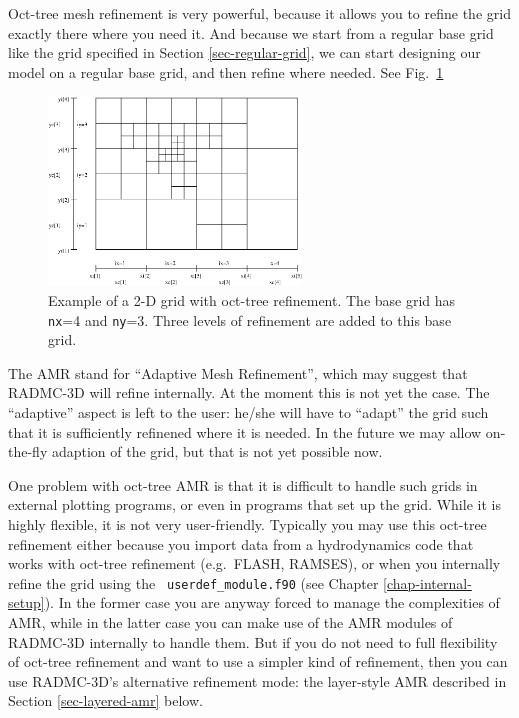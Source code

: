\documentclass{report}
\begin{document}
Oct-tree mesh refinement is very powerful, because it allows you to refine
the grid exactly there where you need it. And because we start from a
regular base grid like the grid specified in Section \ref{sec-regular-grid},
we can start designing our model on a regular base grid, and then refine
where needed. See Fig.~\ref{fig-oct-tree-amr}
%
\begin{figure}
\centerline{\includegraphics[width=0.6\textwidth]{oct_tree_amr_bare.eps}}
\caption{\label{fig-oct-tree-amr}
Example of a 2-D grid with oct-tree refinement. The base grid has
{\small\tt nx}=4 and {\small\tt ny}=3. Three levels of refinement are
added to this base grid. 
}
\end{figure}
%

The AMR stand for ``Adaptive Mesh Refinement'', which may suggest that 
RADMC-3D will refine internally. At the moment this is not yet the case.
The ``adaptive'' aspect is left to the user: he/she will have to ``adapt''
the grid such that it is sufficiently refinened where it is needed. In the
future we may allow on-the-fly adaption of the grid, but that is not yet
possible now. 

One problem with oct-tree AMR is that it is difficult to handle such grids
in external plotting programs, or even in programs that set up the grid.
While it is highly flexible, it is not very user-friendly. Typically you may
use this oct-tree refinement either because you import data from a
hydrodynamics code that works with oct-tree refinement (e.g.\ FLASH,
RAMSES), or when you internally refine the grid using the {\small\tt
  userdef\_module.f90} (see Chapter \ref{chap-internal-setup}). In the
former case you are anyway forced to manage the complexities of AMR, while
in the latter case you can make use of the AMR modules of RADMC-3D
internally to handle them. But if you do not need to full flexibility of
oct-tree refinement and want to use a simpler kind of refinement, then
you can use RADMC-3D's alternative refinement mode: the layer-style
AMR described in Section \ref{sec-layered-amr} below.
\end{document}
